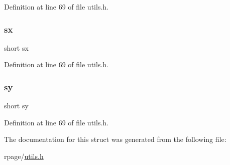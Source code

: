 Definition at line 69 of file utils.\+h.

\mbox{\label{structrect_ad412d3c503fde76edb4b79e9bb5bdee4}} 
\subsubsection{\texorpdfstring{sx}{sx}}
{\footnotesize\ttfamily short sx}



Definition at line 69 of file utils.\+h.

\mbox{\label{structrect_a0153fced86e1addd87ec429590e82741}} 
\subsubsection{\texorpdfstring{sy}{sy}}
{\footnotesize\ttfamily short sy}



Definition at line 69 of file utils.\+h.



The documentation for this struct was generated from the following file\+:\begin{DoxyCompactItemize}
\item 
rpage/\mbox{\hyperlink{utils_8h}{utils.\+h}}\end{DoxyCompactItemize}
